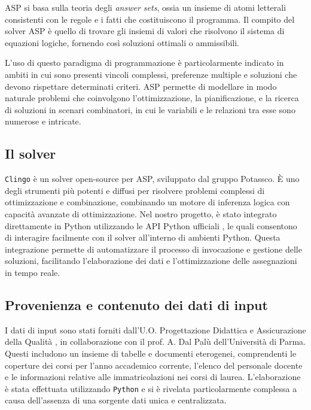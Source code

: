 \documentclass[journal]{IEEEtran}
\begin{document}
ASP si basa sulla teoria degli \textit{answer sets}, ossia un insieme di atomi
letterali consistenti con le regole e i fatti che costituiscono il programma. Il
compito del solver ASP è quello di trovare gli insiemi di valori che risolvono
il sistema di equazioni logiche, fornendo così soluzioni ottimali o ammissibili.

L'uso di questo paradigma di programmazione è particolarmente indicato in ambiti in cui sono presenti vincoli complessi, preferenze multiple e
soluzioni che devono rispettare determinati criteri. ASP permette di modellare
in modo naturale problemi che coinvolgono l'ottimizzazione, la pianificazione, e
la ricerca di soluzioni in scenari combinatori, in cui le variabili e le
relazioni tra esse sono numerose e intricate.

\subsection{Il solver}
\texttt{Clingo} \cite{clingo} è un solver open-source per ASP, sviluppato dal gruppo Potassco.
È uno degli strumenti più potenti e diffusi per risolvere problemi complessi di
ottimizzazione e combinazione, combinando un motore di inferenza logica con
capacità avanzate di ottimizzazione. Nel nostro progetto, è stato integrato
direttamente in Python utilizzando le API Python ufficiali
\cite{clingo_python_api}, le quali consentono di interagire facilmente con il
solver all'interno di ambienti Python. Questa integrazione permette di
automatizzare il processo di invocazione e gestione delle soluzioni, facilitando
l'elaborazione dei dati e l'ottimizzazione delle assegnazioni in tempo reale.

\subsection{Provenienza e contenuto dei dati di input}

I dati di input sono stati forniti dall'U.O. Progettazione Didattica e
Assicurazione della Qualità \cite{unipr_qualita}, in collaborazione con il prof.
A. Dal Palù dell'Università di Parma. Questi includono un insieme di tabelle e
documenti eterogenei, comprendenti le coperture dei corsi per l'anno accademico
corrente, l'elenco del personale docente e le informazioni relative alle
immatricolazioni nei corsi di laurea. L'elaborazione è stata effettuata
utilizzando \texttt{Python} e si è rivelata particolarmente complessa a causa
dell'assenza di una sorgente dati unica e centralizzata.
\end{document}
